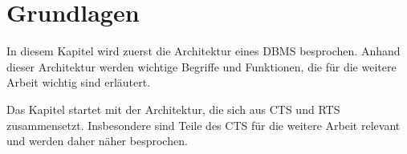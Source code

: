 \newpage
\chapter{Grundlagen}

In diesem Kapitel wird zuerst die Architektur eines \ac{DBMS} besprochen. Anhand dieser Architektur werden wichtige Begriffe und Funktionen, die für die weitere Arbeit wichtig sind erläutert.

Das Kapitel startet mit der Architektur, die sich aus \ac{CTS} und \ac{RTS} zusammensetzt. Insbesondere sind Teile des \ac{CTS} für die weitere Arbeit relevant und werden daher näher besprochen. 














